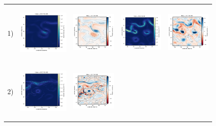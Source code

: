 \documentclass[draft]{agujournal2019}
\begin{document}
\begin{figure}[H]
\begin{center}
\begin{tabular}{ccccc}
\hspace{-10mm}  1)&
\includegraphics[trim={0 13mm 22mm 5mm},clip, width=3.3cm,height=2.9cm]{figures/plots/orca025_train_ke.png} &
 \includegraphics[trim={13mm 13mm 22mm 5mm},clip, width=2.9cm,height=2.9cm]{figures/plots/orca025_train_vort_r.png} &
 \includegraphics[trim={13mm 13mm 22mm 5mm},clip, width=2.9cm,height=2.9cm]{figures/plots/orca025_rec_ke.png} &
 \includegraphics[trim={13mm 13mm 22mm 5mm},clip,width=2.9cm,height=2.9cm]{figures/plots/orca025_rec_vort_r.png} \\
\hspace{-10mm} 2) &
 \includegraphics[trim={0 13mm 22mm 5mm},clip, width=3.3cm,height=2.9cm]{figures/plots/glorys12-f_train_ke.png} &
 \includegraphics[trim={13mm 13mm 22mm 5mm},clip, width=2.9cm,height=2.9cm]{figures/plots/glorys12-f_train_vort_r.png} &

\end{tabular}
\end{center}
\end{figure}
\end{document}

